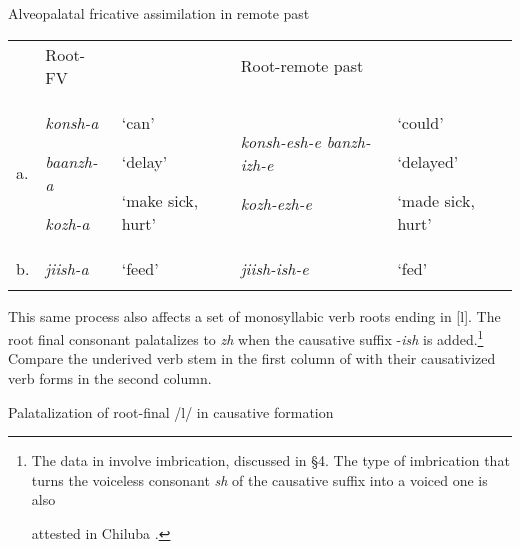 \documentclass[output=paper]{langsci/langscibook}
\begin{document}
\begin{stylelsTableHeading}%
\begin{table}
\caption{Alveopalatal fricative assimilation in remote past}
\label{tab:5}
\end{table}\end{stylelsTableHeading}

\begin{tabular}{lllll} & \mdseries Root-FV &  & \multicolumn{2}{l}{\mdseries Root-remote past}\\
\lsptoprule
\mdseries a. & {\mdseries \emph{konsh-a}}

{\mdseries \emph{baanzh-a}}

\mdseries \emph{kozh-a  } & {\mdseries ‘can’}

{\mdseries ‘delay’  }

\mdseries ‘make sick, hurt’ & {\mdseries \emph{konsh-esh-e banzh-izh-e}}

\mdseries \emph{kozh-ezh-e} & {\mdseries ‘could’}

{\mdseries ‘delayed’}

\mdseries ‘made sick, hurt’\\
\mdseries b. & \mdseries \emph{jiish-a} & \mdseries ‘feed’ & \mdseries \emph{jiish-ish-e} & \mdseries ‘fed’\\
\lspbottomrule
\end{tabular}
\begin{styleBodyTextIndent}
This same process also affects a set of monosyllabic verb roots ending in [l]. The root final consonant palatalizes to \emph{zh} when the causative suffix -\emph{ish} is added.\footnote{ The data in  involve imbrication, discussed in §4. The type of imbrication that       turns the voiceless consonant \emph{sh} of the causative suffix into a voiced one is also\par        attested in Chiluba \citep[73]{Lukusa1993}.\par } Compare the underived verb stem in the first column of  with their causativized verb forms in the second column.
\end{styleBodyTextIndent}

\begin{stylelsTableHeading}%
\begin{table}
\caption{Palatalization of root-final /l/ in causative formation}
\label{tab:6}
\end{table}\end{stylelsTableHeading}
\end{document}
